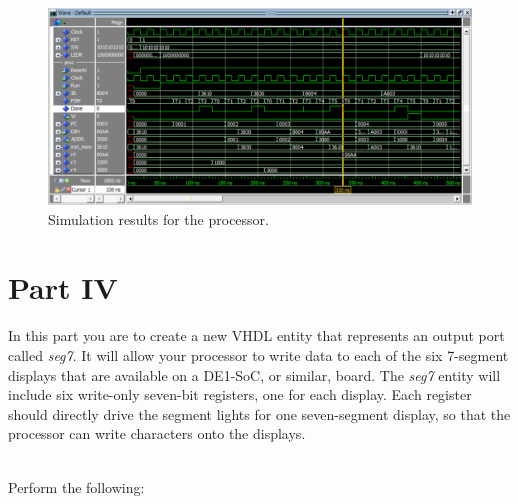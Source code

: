 \documentclass[epsfig,10pt,fullpage]{article} \addtolength{\textwidth}{1.5in}
\begin{document}
\begin{figure}[H]
	\begin{center}
		\includegraphics[width=\textwidth]{figures/part3.png}
	\end{center}
	\caption{Simulation results for the processor.}
	\label{fig:part3}
\end{figure}

\section*{Part IV}
In this part you are to create a new VHDL entity that represents an output port called 
{\it seg7}. It will allow your processor to write data to each of the six 7-segment
displays that are available on a DE1-SoC, or similar, board. The {\it seg7} entity will 
include six write-only seven-bit registers,
one for each display. Each register should directly drive the segment lights for one 
seven-segment display, so that the processor can write characters onto the displays. 

~\\
\noindent
Perform the following:
\end{document}
